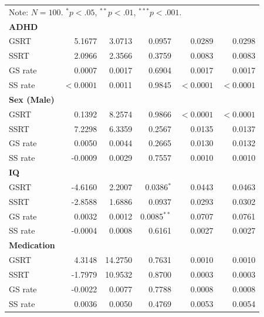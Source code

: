 \begin{longtable}{l r r r r r}
        \bottomrule
        \multicolumn{6}{l}{\footnotesize \rule{0pt}{3ex}Note: $N=100$. $^* p<.05$, $^{**} p<.01$, $^{***} p<.001$.} \\
        \endlastfoot
        \textbf{ADHD} & & & & & \\
        \hspace{4mm} GSRT & 5.1677 & 3.0713 & 0.0957 & 0.0289 & 0.0298 \\
        \hspace{4mm} SSRT & 2.0966 & 2.3566 & 0.3759 & 0.0083 & 0.0083 \\
        \hspace{4mm} GS rate & 0.0007 & 0.0017 & 0.6904 & 0.0017 & 0.0017 \\
        \hspace{4mm} SS rate & $<0.0001$ & 0.0011 & 0.9845 & $<0.0001$ & $<0.0001$ \\
        \midrule
        \textbf{Sex (Male)} & & & & & \\
        \hspace{4mm} GSRT & 0.1392 & 8.2574 & 0.9866 & $<0.0001$ & $<0.0001$ \\
        \hspace{4mm} SSRT & 7.2298 & 6.3359 & 0.2567 & 0.0135 & 0.0137 \\
        \hspace{4mm} GS rate & 0.0050 & 0.0044 & 0.2665 & 0.0130 & 0.0132 \\
        \hspace{4mm} SS rate & -0.0009 & 0.0029 & 0.7557 & 0.0010 & 0.0010 \\
        \midrule
        \textbf{IQ} & & & & & \\
        \hspace{4mm} GSRT & -4.6160 & 2.2007 & 0.0386$^{*}$ & 0.0443 & 0.0463 \\
        \hspace{4mm} SSRT & -2.8588 & 1.6886 & 0.0937 & 0.0293 & 0.0302 \\
        \hspace{4mm} GS rate & 0.0032 & 0.0012 & 0.0085$^{**}$ & 0.0707 & 0.0761 \\
        \hspace{4mm} SS rate & -0.0004 & 0.0008 & 0.6161 & 0.0027 & 0.0027 \\
        \midrule
        \textbf{Medication} & & & & & \\
        \hspace{4mm} GSRT & 4.3148 & 14.2750 & 0.7631 & 0.0010 & 0.0010 \\
        \hspace{4mm} SSRT & -1.7979 & 10.9532 & 0.8700 & 0.0003 & 0.0003 \\
        \hspace{4mm} GS rate & -0.0022 & 0.0077 & 0.7788 & 0.0008 & 0.0008 \\
        \hspace{4mm} SS rate & 0.0036 & 0.0050 & 0.4769 & 0.0053 & 0.0054 \\
    \end{longtable}
\endgroup